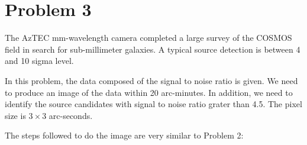 \section*{Problem 3}

The AzTEC mm-wavelength camera completed a large survey of the COSMOS field in search for sub-millimeter galaxies. 
A typical source detection is between 4 and 10 sigma level. 

In this problem, the data composed of the signal to noise ratio is given. We need to produce an image of the data within 20 arc-minutes. In addition, we need to identify the source candidates with signal to noise ratio grater than 4.5.
The pixel size is $3 \times 3$ arc-seconds.

The steps followed to do the image are very similar to Problem 2:

